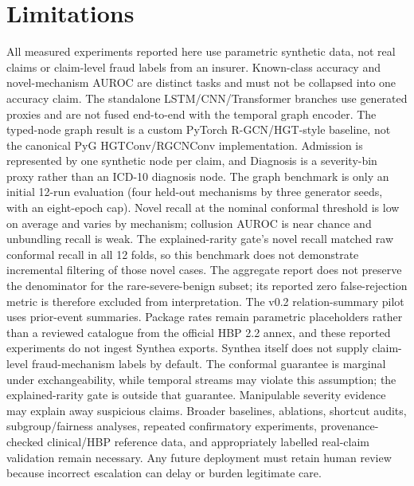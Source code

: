 \documentclass[conference]{IEEEtran}
\begin{document}
\section{Limitations}
All measured experiments reported here use parametric synthetic data, not real claims or claim-level fraud labels from an insurer. Known-class accuracy and novel-mechanism AUROC are distinct tasks and must not be collapsed into one accuracy claim. The standalone LSTM/CNN/Transformer branches use generated proxies and are not fused end-to-end with the temporal graph encoder. The typed-node graph result is a custom PyTorch R-GCN/HGT-style baseline, not the canonical PyG HGTConv/RGCNConv implementation. Admission is represented by one synthetic node per claim, and Diagnosis is a severity-bin proxy rather than an ICD-10 diagnosis node. The graph benchmark is only an initial 12-run evaluation (four held-out mechanisms by three generator seeds, with an eight-epoch cap). Novel recall at the nominal conformal threshold is low on average and varies by mechanism; collusion AUROC is near chance and unbundling recall is weak. The explained-rarity gate's novel recall matched raw conformal recall in all 12 folds, so this benchmark does not demonstrate incremental filtering of those novel cases. The aggregate report does not preserve the denominator for the rare-severe-benign subset; its reported zero false-rejection metric is therefore excluded from interpretation. The v0.2 relation-summary pilot uses prior-event summaries. Package rates remain parametric placeholders rather than a reviewed catalogue from the official HBP 2.2 annex, and these reported experiments do not ingest Synthea exports. Synthea itself does not supply claim-level fraud-mechanism labels by default. The conformal guarantee is marginal under exchangeability, while temporal streams may violate this assumption; the explained-rarity gate is outside that guarantee. Manipulable severity evidence may explain away suspicious claims. Broader baselines, ablations, shortcut audits, subgroup/fairness analyses, repeated confirmatory experiments, provenance-checked clinical/HBP reference data, and appropriately labelled real-claim validation remain necessary. Any future deployment must retain human review because incorrect escalation can delay or burden legitimate care.
\end{document}

